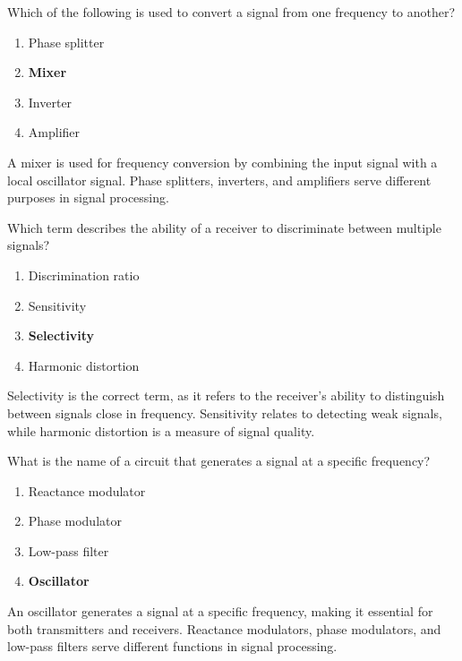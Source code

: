 
\begin{tcolorbox}[colback=gray!10!white,colframe=black!75!black,title={T7A03}]
    Which of the following is used to convert a signal from one frequency to another?
    \begin{enumerate}[label=\Alph*),noitemsep]
        \item Phase splitter
        \item \textbf{Mixer}
        \item Inverter
        \item Amplifier
    \end{enumerate}
\end{tcolorbox}
A mixer is used for frequency conversion by combining the input signal with a local oscillator signal. Phase splitters, inverters, and amplifiers serve different purposes in signal processing.


\begin{tcolorbox}[colback=gray!10!white,colframe=black!75!black,title={T7A04}]
    Which term describes the ability of a receiver to discriminate between multiple signals?
    \begin{enumerate}[label=\Alph*),noitemsep]
        \item Discrimination ratio
        \item Sensitivity
        \item \textbf{Selectivity}
        \item Harmonic distortion
    \end{enumerate}
\end{tcolorbox}
Selectivity is the correct term, as it refers to the receiver's ability to distinguish between signals close in frequency. Sensitivity relates to detecting weak signals, while harmonic distortion is a measure of signal quality.


\begin{tcolorbox}[colback=gray!10!white,colframe=black!75!black,title={T7A05}]
    What is the name of a circuit that generates a signal at a specific frequency?
    \begin{enumerate}[label=\Alph*),noitemsep]
        \item Reactance modulator
        \item Phase modulator
        \item Low-pass filter
        \item \textbf{Oscillator}
    \end{enumerate}
\end{tcolorbox}
An oscillator generates a signal at a specific frequency, making it essential for both transmitters and receivers. Reactance modulators, phase modulators, and low-pass filters serve different functions in signal processing.

